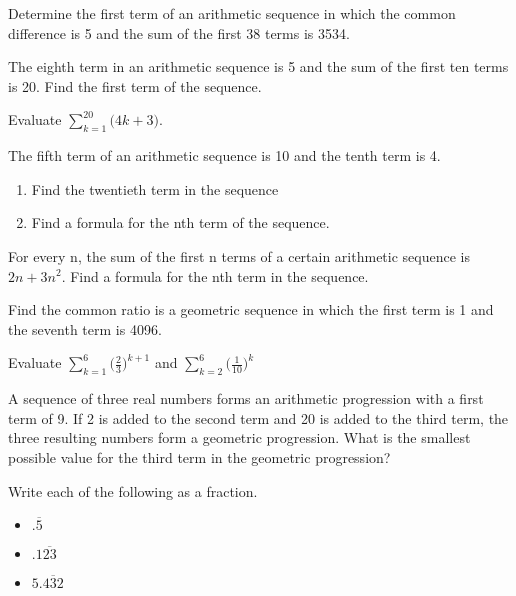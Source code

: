 \documentclass[12pt]{amsart}
\theoremstyle{definition}
\begin{document}
\problem Determine the first term of an arithmetic sequence in which the common difference is 5 and the sum of the first 38 terms is 3534.\vspace{.05in}%

\problem The eighth term in an arithmetic sequence is 5 and the sum of the first ten terms is 20. Find the first term of the sequence.\vspace{.05in}%

\problem Evaluate $\displaystyle \sum_{k=1}^{20}\big (4k+3\big )$.\vspace{.05in}%

\problem The fifth term of an arithmetic sequence is 10 and the tenth term is 4. \vspace{.05in}
 	\begin{enumerate}
		\item Find the twentieth term in the sequence\vspace{.05in}
		\item Find a formula for the nth term of the sequence.\vspace{.05in}
	\end{enumerate}

\problem  For every n, the sum of the first n terms of a certain arithmetic sequence is $2n+3n^2$. Find a formula for the nth term in the sequence.\vspace{.05in}

\problem Find the common ratio is a geometric sequence in which the first term is 1 and the seventh term is 4096.\vspace{.05in}%

\problem Evaluate $\displaystyle \sum_{k=1}^{6}\Big (\frac{2}{3}\Big )^{k+1}$ and $\displaystyle \sum_{k=2}^{6}\Big (\frac{1}{10}\Big )^{k}$\vspace{.05in}%

\problem  A sequence of three real numbers forms an arithmetic progression with a first term of 9.  If 2 is added to the second term and 20 is added to the third term, the three resulting numbers form a geometric progression.  What is the smallest possible value for the third term in the geometric progression?\vspace{.05in}

\newpage

\problem Write each of the following as a fraction.\vspace{.05in}
\begin{itemize}
	\item $.\overline{5}$ \vspace{.05in}
	\item $.1\overline{23}$\vspace{.05in}
	\item $5.\overline{432}$
\end{itemize}\vspace{.05in}%
\end{document}
